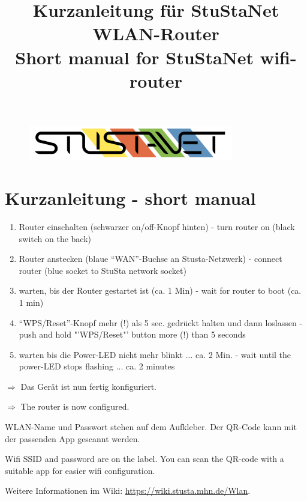 \documentclass[a4paper,11pt]{scrartcl}
\title{Kurzanleitung für StuStaNet WLAN-Router\\Short manual for StuStaNet wifi-router}
\date{}
\begin{document}
\maketitle

\begin{figure}[t!]
   \centering
   \vspace{-20pt}
   \includegraphics[width=0.8\textwidth,keepaspectratio]{Bilder/StuStaNet_Logo}
   \vspace{-20pt}
\end{figure}


\section*{Kurzanleitung - short manual}

\begin{enumerate}
    \item Router einschalten (schwarzer on/off-Knopf hinten) - turn router on (black switch on the back)
    \item Router anstecken (blaue "`WAN"'-Buchse an Stusta-Netzwerk) - connect router (blue socket to StuSta network socket)
    \item warten, bis der Router gestartet ist (ca. 1 Min) - wait for router to boot (ca. 1 min)
    \item "`WPS/Reset"'-Knopf mehr (!) als 5 sec. gedrückt halten und dann loslassen - push and hold "'WPS/Reset"' button more (!) than 5 seconds
    \item warten bis die Power-LED nicht mehr blinkt ... ca. 2 Min. - wait until the power-LED stops flashing ... ca. 2 minutes
\end{enumerate}

$\Rightarrow$ Das Gerät ist nun fertig konfiguriert.

$\Rightarrow$ The router is now configured.
\vspace{1em}

WLAN-Name und Passwort stehen auf dem Aufkleber. Der QR-Code kann mit der passenden App gescannt werden. 

Wifi SSID and password are on the label. You can scan the QR-code with a suitable app for easier wifi configuration.

Weitere Informationen im Wiki: \url{https://wiki.stusta.mhn.de/Wlan}.\\[1em]
\end{document}
